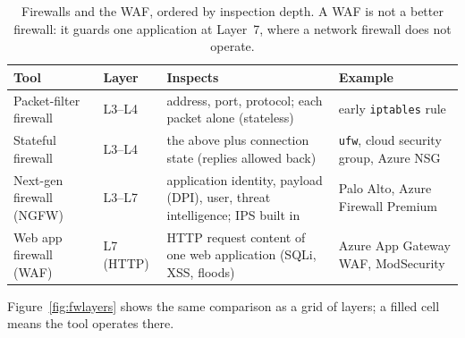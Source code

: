 \begin{table}[htbp]
\centering
\small
\begin{tabular}{@{}l l p{4.3cm} p{3.3cm}@{}}
\toprule
\textbf{Tool} & \textbf{Layer} & \textbf{Inspects} & \textbf{Example} \\
\midrule
Packet-filter firewall & L3--L4 & address, port, protocol; each packet alone (stateless) & early \texttt{iptables} rule \\
Stateful firewall & L3--L4 & the above plus connection state (replies allowed back) & \texttt{ufw}, cloud security group, Azure NSG \\
Next-gen firewall (NGFW) & L3--L7 & application identity, payload (DPI), user, threat intelligence; IPS built in & Palo Alto, Azure Firewall Premium \\
Web app firewall (WAF) & L7 (HTTP) & HTTP request content of one web application (SQLi, XSS, floods) & Azure App Gateway WAF, ModSecurity \\
\bottomrule
\end{tabular}
\caption{Firewalls and the WAF, ordered by inspection depth. A WAF is not a
better firewall: it guards one application at Layer~7, where a network
firewall does not operate.}
\label{tab:firewalls}
\end{table}

Figure~\ref{fig:fwlayers} shows the same comparison as a grid of layers; a
filled cell means the tool operates there.

